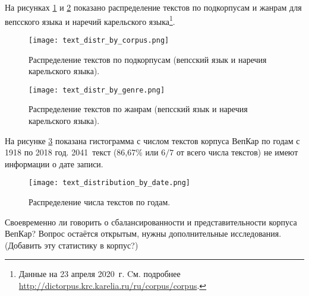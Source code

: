 На рисунках \ref{fig:text_distr_by_corpus} и \ref{fig:text_distr_by_genre} показано распределение текстов по подкорпусам и жанрам для вепсского языка и наречий карельского языка\footnote{ Данные на 23 апреля 2020~г. Cм. подробнее 
			\href{http://dictorpus.krc.karelia.ru/ru/corpus/corpus}{http://dictorpus.krc.karelia.ru/ru/corpus/corpus}.}.

\begin{figure}
    \centering
    \texttt{[image: text\_distr\_by\_corpus.png]}
    \caption{Распределение текстов по подкорпусам (вепсский язык и наречия карельского языка).}
    \label{fig:text_distr_by_corpus}
\end{figure}

\begin{figure}
    \centering
    \texttt{[image: text\_distr\_by\_genre.png]}
    \caption{Распределение текстов по жанрам (вепсский язык и наречия карельского языка).}
    \label{fig:text_distr_by_genre}
\end{figure}

На рисунке \ref{fig:text_distribution_by_date} показана гистограмма 
с числом текстов корпуса ВепКар по годам с 1918 по 2018 год. 
2041~текст (86,67\% или $6/7$ от всего числа текстов) не имеют информации о дате записи.
\begin{figure}
    \centering
    \texttt{[image: text\_distribution\_by\_date.png]}
    \caption{Распределение числа текстов по годам.}
    \label{fig:text_distribution_by_date}
\end{figure}

Своевременно ли говорить о сбалансированности и представительности корпуса ВепКар? Вопрос остаётся открытым, нужны дополнительные исследования.
(Добавить эту статистику в корпус?)


